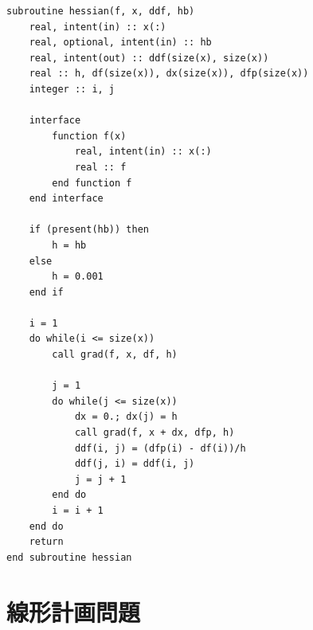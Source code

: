 \documentclass[dvipdfmx, 9pt, a4paper]{jsarticle}
\numberwithin{equation}{section}
\begin{document}
\begin{lstlisting}[caption=ヘッセ行列を求めるためのサブルーチン]
subroutine hessian(f, x, ddf, hb)
	real, intent(in) :: x(:)
	real, optional, intent(in) :: hb
	real, intent(out) :: ddf(size(x), size(x))
	real :: h, df(size(x)), dx(size(x)), dfp(size(x))
	integer :: i, j

	interface
		function f(x)
			real, intent(in) :: x(:)
			real :: f
		end function f
	end interface

	if (present(hb)) then
		h = hb
	else
		h = 0.001
	end if

	i = 1
	do while(i <= size(x))
		call grad(f, x, df, h)

		j = 1
		do while(j <= size(x))
			dx = 0.; dx(j) = h
			call grad(f, x + dx, dfp, h)
			ddf(i, j) = (dfp(i) - df(i))/h
			ddf(j, i) = ddf(i, j)
			j = j + 1
		end do
		i = i + 1
	end do
	return
end subroutine hessian
\end{lstlisting}

\section{線形計画問題}
\end{document}
